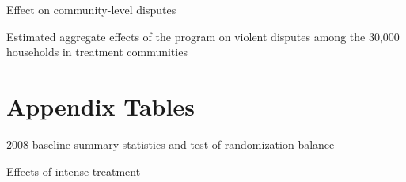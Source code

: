 \documentclass[10pt]{article}
\begin{document}
\begin{table}[H]
\caption{Effect on community-level disputes}
\begin{center}
\begin{adjustbox}{max width = \textwidth}

\end{adjustbox}
\end{center}
\end{table}

\begin{table}[H]
\caption{Estimated aggregate effects of the program on violent disputes among the 30,000 households in treatment communities}
\begin{center}
\begin{adjustbox}{max width = \textwidth}

\end{adjustbox}
\end{center}
\end{table}

\section{Appendix Tables}
\clearpage
\setcounter{table}{0}   
\renewcommand{\thetable}{A.\arabic{table}}

\begin{table}[H]
\caption{2008 baseline summary statistics and test of randomization balance}
\begin{center}
\begin{adjustbox}{max width = \textwidth}
\end{adjustbox}
\end{center}
\end{table}


\begin{table}[H]
\caption{Effects of intense treatment}
\begin{center}
\begin{adjustbox}{max width = \textwidth}

\end{adjustbox}
\end{center}
\end{table}
\end{document}

